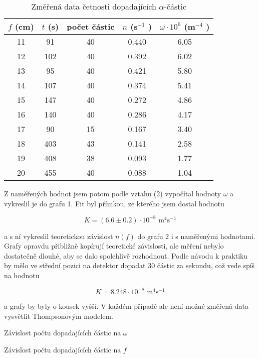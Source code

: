 \documentclass[a4paper,11pt]{article}
\begin{document}
\begin{table}[htpb]
    \centering
    \begin{tabular}{| c c c c c |}
        \hline
        $ f $  (cm) & $ t $ (s) &  počet částic & $ n $ (s$^{-1}  $ ) &  $ \omega \cdot 10^{6} $ (m$ ^{-4}  $ )  \\
        \hline
        11 &  91  & 40 & 0.440 & 6.05 \\
        12 &  102 & 40 & 0.392 & 6.02 \\
        13 &  95  & 40 & 0.421 & 5.80 \\
        14 &  107 & 40 & 0.374 & 5.41 \\
        15 &  147 & 40 & 0.272 & 4.86 \\
        16 &  140 & 40 & 0.286 & 4.17 \\
        17 &  90  & 15 & 0.167 & 3.40 \\
        18 &  403 & 43 & 0.141 & 2.58 \\
        19 &  408 & 38 & 0.093 & 1.77 \\
        20 &  455 & 40 & 0.088 & 1.04 \\
        \hline
    \end{tabular}
    \caption{Změřená data četnosti dopadajících $ \alpha $-částic }
    
\end{table}

Z naměřených hodnot jsem potom podle vztahu (2) vypočítal hodnoty $ \omega $ a vykreslil je do grafu 1. Fit byl přímkou, ze kterého jsem dostal hodnotu

\begin{equation}
K = (6.6 \pm 0.2) \cdot 10^{-8} \text{ m}^{4}\text{s}^{-1}
\end{equation}

\noindent
a s ní vykreslil teoretickou závislost $ n(f) $ do grafu 2 i s naměřenými hodnotami.  Grafy opravdu přibližně kopírují teoretické závislosti, ale měření nebylo dostatečně dlouhé, aby se dalo spolehlivě rozhodnout. Podle návodu k praktiku by mělo ve střední pozici na detektor dopadat 30 částic za sekundu, což vede spíš na hodnotu 

\begin{equation}
K = 8.248  \cdot 10^{-8} \text{ m}^{4}\text{s}^{-1}
\end{equation}

\noindent
a grafy by byly o kousek vyšší. V každém případě ale není možné změřená data vysvětlit Thompsonovým modelem. 

\begin{table}[htpb]
    \begin{minipage}[b]{.48\linewidth}
        \centering
        \resizebox{\textwidth}{!}{  }
        \captionsetup{type=graph}
        \caption{ Závislost počtu dopadajících částic na $ \omega $  }
    \end{minipage} 
    \hfill
    \begin{minipage}[b]{.48\linewidth}
        \centering
        \resizebox{\textwidth}{!}{  }
        \captionsetup{type=graph}
        \caption{ Závislost počtu dopadajících částic na $ f $  }
    \end{minipage} 
\end{table}
\end{document}
